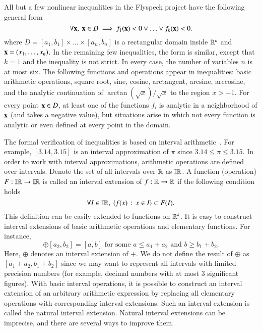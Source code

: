 All but a few nonlinear inequalities in the Flyspeck project have the
following general form
\begin{equation}\label{eqn:D}
\forall {\bf x},\ {\bf x} \in D \implies f_1({\bf x}) < 0 \vee \ldots \vee f_k({\bf x}) < 0.
\end{equation}
where $D = [a_1,b_1] \times \ldots \times [a_n, b_n]$ is a rectangular
domain inside $\mathbb{R}^n$ and ${\bf x} = (x_1,\ldots,x_n)$. In the remaining
few inequalities, the form is similar, except that $k=1$ and the
inequality is not strict.  In every case, the number of variables $n$
is at most six. The following functions and operations appear in
inequalities: basic arithmetic operations, square root, sine, cosine,
arctangent, arcsine, arccosine, and the analytic continuation of
$\arctan(\sqrt{x})/\sqrt{x}$ to the region $x > -1$.  For every point
${\bf x}\in D$, at least one of the functions $f_i$ is analytic in a
neighborhood of ${\bf x}$ (and takes a negative value), but situations
arise in which not every function is analytic or even defined at every
point in the domain.

The formal verification of inequalities is based on interval
arithmetic~\cite{moore2009introduction}.  For example, $[3.14, 3.15]$
is an interval approximation of $\pi$ since $3.14 \le \pi \le 3.15$.
In order to work with interval approximations, arithmetic operations
are defined over intervals. Denote the set of all intervals over $\mathbb{R}$
as $\mathbb{IR}$. A function (operation) $F:\mathbb{IR} \to \mathbb{IR}$ is called an interval
extension of $f:\mathbb{R} \to \mathbb{R}$ if the following condition holds
\begin{equation*}
\forall I \in \mathbb{IR},\ \{ f(x)\,:\,x \in I \} \subset F(I).
\end{equation*}
This definition can be easily extended to functions on $\mathbb{R}^k$. It is
easy to construct interval extensions of basic arithmetic operations
and elementary functions. For instance,
\begin{equation*}
[a_1,b_1] \oplus [a_2,b_2]= [a, b] \text { for some $a \le a_1 + a_2$ and $b \ge b_1 + b_2$}.
\end{equation*}
Here, $\oplus$ denotes an interval extension of $+$. We do not define
the result of $\oplus$ as $[a_1 + a_2, b_1 + b_2]$ since we may want
to represent all intervals with limited precision numbers (for
example, decimal numbers with at most 3 significant figures). With
basic interval operations, it is possible to construct an interval
extension of an arbitrary arithmetic expression by replacing all
elementary operations with corresponding interval extensions. Such an
interval extension is called the natural interval extension. Natural
interval extensions can be imprecise, and there are several ways to
improve them.

